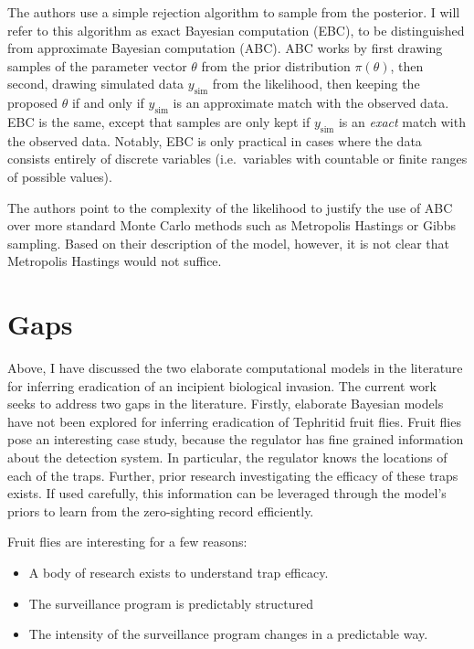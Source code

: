 \documentclass[
]{book}
\providecommand{\tightlist}{%
  \setlength{\itemsep}{0pt}\setlength{\parskip}{0pt}}
\begin{document}
The authors use a simple rejection algorithm to sample from the posterior. I will refer to this algorithm as exact Bayesian computation (EBC), to be distinguished from approximate Bayesian computation (ABC). ABC works by first drawing samples of the parameter vector \(\theta\) from the prior distribution \(\pi(\theta)\), then second, drawing simulated data \(y_{\text{sim}}\) from the likelihood, then keeping the proposed \(\theta\) if and only if \(y_{\text{sim}}\) is an approximate match with the observed data. EBC is the same, except that samples are only kept if \(y_{\text{sim}}\) is an \emph{exact} match with the observed data. Notably, EBC is only practical in cases where the data consists entirely of discrete variables (i.e.~variables with countable or finite ranges of possible values).

The authors point to the complexity of the likelihood to justify the use of ABC over more standard Monte Carlo methods such as Metropolis Hastings or Gibbs sampling. Based on their description of the model, however, it is not clear that Metropolis Hastings would not suffice.

\hypertarget{gaps}{%
\section{Gaps}\label{gaps}}

Above, I have discussed the two elaborate computational models in the literature for inferring eradication of an incipient biological invasion. The current work seeks to address two gaps in the literature. Firstly, elaborate Bayesian models have not been explored for inferring eradication of Tephritid fruit flies. Fruit flies pose an interesting case study, because the regulator has fine grained information about the detection system. In particular, the regulator knows the locations of each of the traps. Further, prior research investigating the efficacy of these traps exists. If used carefully, this information can be leveraged through the model's priors to learn from the zero-sighting record efficiently.

Fruit flies are interesting for a few reasons:

\begin{itemize}
\tightlist
\item
  A body of research exists to understand trap efficacy.
\item
  The surveillance program is predictably structured
\item
  The intensity of the surveillance program changes in a predictable way.
\end{itemize}
\end{document}
